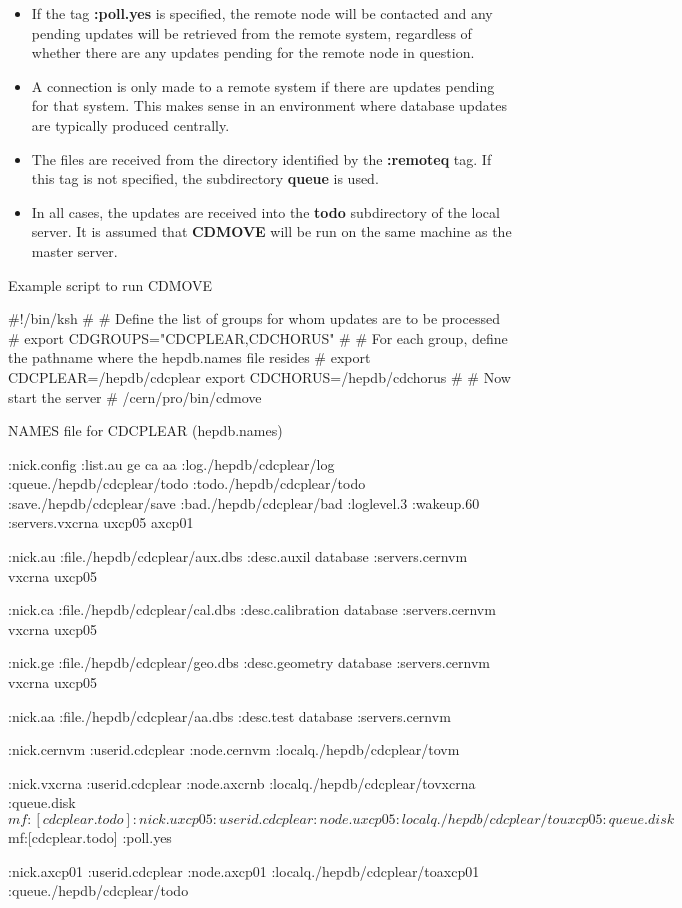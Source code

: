 \begin{itemize}
\item
If the tag {\bf :poll.yes} is specified, the remote node
will be contacted and any pending updates
will be retrieved from the remote system, regardless of
whether there are any updates pending for the remote node
in question.

\item
A connection is only made to a remote system if there are updates
pending for that system. This makes sense in an environment where
database updates are typically produced centrally.

\item
The files are received from the directory identified by the
{\bf :remoteq} tag. If this tag is not specified, the
subdirectory {\bf queue} is used.

\item
In all cases, the updates are received into the {\bf todo}
subdirectory of the local server. It is assumed
that {\bf CDMOVE} will be run on the same machine
as the master server.

\end{itemize}

\begin{XMPt}{Example script to run CDMOVE}

#!/bin/ksh
#
# Define the list of groups for whom updates are to be processed
#
export CDGROUPS="CDCPLEAR,CDCHORUS"
#
# For each group, define the pathname where the hepdb.names file resides
#
export CDCPLEAR=/hepdb/cdcplear
export CDCHORUS=/hepdb/cdchorus
#
# Now start the server
#
/cern/pro/bin/cdmove

\end{XMPt}

\begin{XMPt}{NAMES file for CDCPLEAR (hepdb.names) }

:nick.config
   :list.au ge ca aa
   :log./hepdb/cdcplear/log
   :queue./hepdb/cdcplear/todo
   :todo./hepdb/cdcplear/todo
   :save./hepdb/cdcplear/save
   :bad./hepdb/cdcplear/bad
   :loglevel.3
   :wakeup.60
   :servers.vxcrna uxcp05 axcp01

:nick.au
   :file./hepdb/cdcplear/aux.dbs
   :desc.auxil database
   :servers.cernvm vxcrna uxcp05

:nick.ca
   :file./hepdb/cdcplear/cal.dbs
   :desc.calibration database
   :servers.cernvm vxcrna uxcp05

:nick.ge
   :file./hepdb/cdcplear/geo.dbs
   :desc.geometry database
   :servers.cernvm vxcrna uxcp05

:nick.aa
   :file./hepdb/cdcplear/aa.dbs
   :desc.test database
   :servers.cernvm

:nick.cernvm
   :userid.cdcplear
   :node.cernvm
   :localq./hepdb/cdcplear/tovm

:nick.vxcrna
   :userid.cdcplear
   :node.axcrnb
   :localq./hepdb/cdcplear/tovxcrna
   :queue.disk$mf:[cdcplear.todo]

:nick.uxcp05
   :userid.cdcplear
   :node.uxcp05
   :localq./hepdb/cdcplear/touxcp05
   :queue.disk$mf:[cdcplear.todo]
   :poll.yes

:nick.axcp01
   :userid.cdcplear
   :node.axcp01
   :localq./hepdb/cdcplear/toaxcp01
   :queue./hepdb/cdcplear/todo
\end{XMPt}

